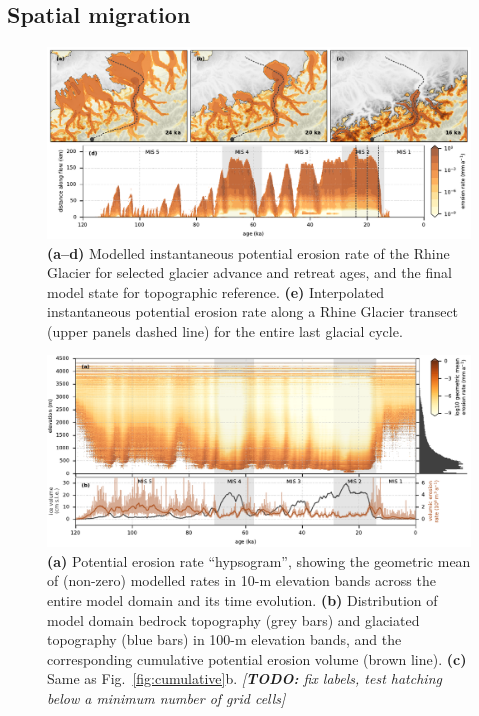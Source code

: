 \documentclass[esurf, manuscript]{copernicus}
\newcommand{\todo}[1]{\textcolor{Rd}{\emph{[\textbf{TODO:} #1]}}}
\begin{document}
\subsection{Spatial migration}

    \begin{figure}
      \centerline{\includegraphics{alpero_transects}}
      \caption{%
        \textbf{(a--d)} Modelled instantaneous potential erosion rate of the
          Rhine Glacier for selected glacier advance and retreat ages, and the
          final model state for topographic reference.
        \textbf{(e)} Interpolated instantaneous potential erosion rate along a
          Rhine Glacier transect (upper panels dashed line) for the entire last
          glacial cycle.}
      \label{fig:transects}
    \end{figure}

    \begin{figure}
      \centerline{\includegraphics{alpero_hypsogram}}
      \caption{%
        \textbf{(a)} Potential erosion rate ``hypsogram'', showing the
          geometric mean of (non-zero) modelled rates in 10-m elevation bands
          across the entire model domain and its time evolution.
        \textbf{(b)} Distribution of model domain bedrock topography (grey
          bars) and glaciated topography (blue bars) in 100-m elevation bands,
          and the corresponding cumulative potential erosion volume (brown
          line).
        \textbf{(c)} Same as Fig.~\ref{fig:cumulative}b.
        \todo{fix labels, test hatching below a minimum number of grid cells}}
      \label{fig:hypsogram}
    \end{figure}
\end{document}
